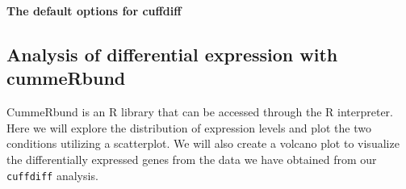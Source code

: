 \documentclass[a4paper,10pt]{article}
\begin{document}
\setlength\fboxsep{0pt}\vspace{1em}
\textbf{The default options for cuffdiff}\\
\setlength\fboxsep{0pt}\vspace{1em}

\subsection{Analysis of differential expression with cummeRbund}
CummeRbund is an R library that can be accessed through the R interpreter.  Here we will explore the distribution of expression levels and plot the two conditions utilizing a scatterplot.  We will also create a volcano plot to visualize the differentially expressed genes from the data we have obtained from our \texttt{\footnotesize{cuffdiff}} analysis.
\end{document}
